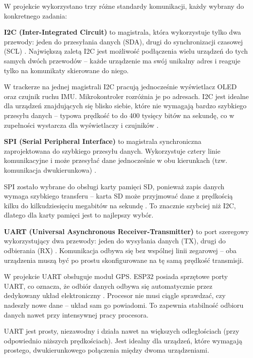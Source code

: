 \documentclass[12pt, a4paper]{EE-dyplom}
\begin{document}
W projekcie wykorzystano trzy różne standardy komunikacji, każdy wybrany do konkretnego zadania:

\textbf{I2C (Inter-Integrated Circuit)} to magistrala, która wykorzystuje tylko dwa przewody: jeden do przesyłania danych (SDA), drugi do synchronizacji czasowej (SCL) \cite{wonderfulpcb_protocols}. Największą zaletą I2C jest możliwość podłączenia wielu urządzeń do tych samych dwóch przewodów – każde urządzenie ma swój unikalny adres i reaguje tylko na komunikaty skierowane do niego.

W trackerze na jednej magistrali I2C pracują jednocześnie wyświetlacz OLED oraz czujnik ruchu IMU. Mikrokontroler rozróżnia je po adresach. I2C jest idealne dla urządzeń znajdujących się blisko siebie, które nie wymagają bardzo szybkiego przesyłu danych – typowa prędkość to do 400 tysięcy bitów na sekundę, co w zupełności wystarcza dla wyświetlaczy i czujników \cite{ourpcb_i2c_spi}.

\vspace{0.5cm}
\textbf{SPI (Serial Peripheral Interface)} to magistrala synchroniczna zaprojektowana do szybkiego przesyłu danych. Wykorzystuje cztery linie komunikacyjne i może przesyłać dane jednocześnie w obu kierunkach (tzw. komunikacja dwukierunkowa) \cite{wonderfulpcb_protocols}.

SPI zostało wybrane do obsługi karty pamięci SD, ponieważ zapis danych wymaga szybkiego transferu – karta SD może przyjmować dane z prędkością kilku do kilkudziesięciu megabitów na sekundę \cite{ourpcb_i2c_spi}. To znacznie szybciej niż I2C, dlatego dla karty pamięci jest to najlepszy wybór.

\vspace{0.5cm}
\textbf{UART (Universal Asynchronous Receiver-Transmitter)} to port szeregowy wykorzystujący dwa przewody: jeden do wysyłania danych (TX), drugi do odbierania (RX) \cite{elektropraktyk_uart}. Komunikacja odbywa się bez wspólnej linii zegarowej – oba urządzenia muszą być po prostu skonfigurowane na tę samą prędkość transmisji.

W projekcie UART obsługuje moduł GPS. ESP32 posiada sprzętowe porty UART, co oznacza, że odbiór danych odbywa się automatycznie przez dedykowany układ elektroniczny \cite{esp32_trm}. Procesor nie musi ciągle sprawdzać, czy nadeszły nowe dane – układ sam go powiadomi. To zapewnia stabilność odbioru danych nawet przy intensywnej pracy procesora.

UART jest prosty, niezawodny i działa nawet na większych odległościach (przy odpowiednio niższych prędkościach). Jest idealny dla urządzeń, które wymagają prostego, dwukierunkowego połączenia między dwoma urządzeniami.
\end{document}
